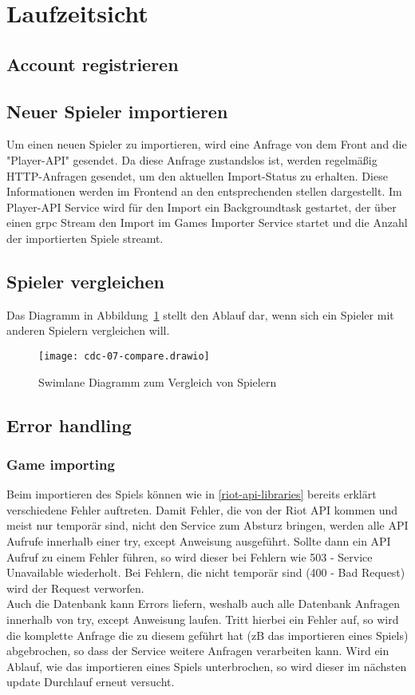 \section{Laufzeitsicht}
\subsection{Account registrieren}
\subsection{Neuer Spieler importieren}

Um einen neuen Spieler zu importieren, wird eine Anfrage von dem Front and die "Player-API" gesendet.
Da diese Anfrage zustandslos ist, werden regelmäßig HTTP-Anfragen gesendet, um den aktuellen Import-Status
zu erhalten.
Diese Informationen werden im Frontend an den entsprechenden stellen dargestellt.
Im Player-API Service wird für den Import ein Backgroundtask gestartet, der über einen grpc Stream den Import im
Games Importer Service startet und die Anzahl der importierten Spiele streamt.


\subsection{Spieler vergleichen}

Das Diagramm in Abbildung~\ref{fig:compare-diagram} stellt den Ablauf dar, wenn sich ein Spieler mit anderen Spielern vergleichen will.
\begin{figure}
    \centering
    \texttt{[image: cdc-07-compare.drawio]}
    \caption{Swimlane Diagramm zum Vergleich von Spielern}
    \label{fig:compare-diagram}
\end{figure}


\subsection{Error handling}
\subsubsection{Game importing}
Beim importieren des Spiels können wie in \ref{riot-api-libraries} bereits erklärt verschiedene Fehler auftreten. Damit Fehler, die von der Riot API kommen und meist nur temporär sind, nicht den Service zum Absturz bringen, werden alle API Aufrufe innerhalb einer try, except Anweisung ausgeführt. Sollte dann ein API Aufruf zu einem Fehler führen, so wird dieser bei Fehlern wie 503 - Service Unavailable wiederholt. Bei Fehlern, die nicht temporär sind (400 - Bad Request) wird der Request verworfen.\\
Auch die Datenbank kann Errors liefern, weshalb auch alle Datenbank Anfragen innerhalb von try, except Anweisung laufen. Tritt hierbei ein Fehler auf, so wird die komplette Anfrage die zu diesem geführt hat (zB das importieren eines Spiels) abgebrochen, so dass der Service weitere Anfragen verarbeiten kann. Wird ein Ablauf, wie das importieren eines Spiels unterbrochen, so wird dieser im nächsten update Durchlauf erneut versucht.

